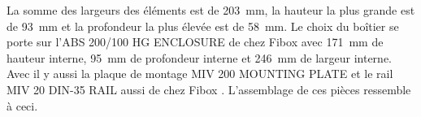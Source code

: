\begin{table}[H]
    \centering
    \caption{Éléments choisis pour le boîtier électrique}
    \label{tab:ChoixElem}
\end{table}

La somme des largeurs des éléments est de 203~mm, la hauteur la plus grande est de 93~mm et la profondeur la plus élevée est de 58~mm. Le choix
du boîtier se porte sur l'ABS 200/100 HG ENCLOSURE de chez Fibox \cite{Fibox} avec 171~mm de hauteur interne, 95~mm de profondeur interne et
246~mm de largeur interne. Avec il y aussi la plaque de montage MIV 200 MOUNTING PLATE et le rail MIV 20 DIN-35 RAIL aussi de chez Fibox \cite{Fibox}.
L'assemblage de ces pièces ressemble à ceci.

